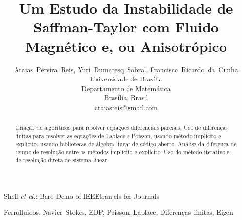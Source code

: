 \documentclass[journal]{IEEEtran}
\begin{document}
\title{Um Estudo da Instabilidade de Saffman-Taylor com Fluido Magnético e, ou Anisotrópico}


\author{Ataias~Pereira~Reis, Yuri~Dumaresq~Sobral, Francisco~Ricardo~da~Cunha\\Universidade de Brasília\\Departamento de Matemática\\Brasília, Brasil\\ataiasreis@gmail.com}

%
{Shell \MakeLowercase{\textit{et al.}}: Bare Demo of IEEEtran.cls for Journals}

\maketitle


\begin{abstract}
Criação de algoritmos para resolver equações diferenciais parciais. Uso de diferenças finitas para resolver as equações de Laplace e Poisson, usando método ímplicito e explícito, usando bibliotecas de álgebra linear de código aberto. Análise da diferença de tempo de resolução entre os métodos implícito e explícito. Uso do método iterativo e de resolução direta de sistema linear. 
\end{abstract}

\begin{IEEEkeywords}
Ferrofluidos, Navier~Stokes, EDP, Poisson, Laplace, Diferenças~finitas, Eigen
\end{IEEEkeywords}

%
\IEEEpeerreviewmaketitle
\end{document}
